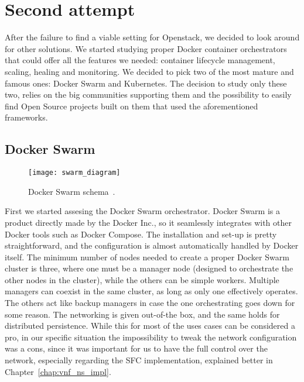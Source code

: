 \section{Second attempt}

After the failure to find a viable setting for Openstack, we decided to look
around for other solutions. We started studying proper Docker container
orchestrators that could offer all the features we needed: container lifecycle
management, scaling, healing and monitoring. We decided to pick two of the most
mature and famous ones: Docker Swarm and Kubernetes. The decision to study only
these two, relies on the big communities supporting them and the possibility to
easily find Open Source projects built on them that used the aforementioned
frameworks.

\subsection{Docker Swarm}

\begin{figure}[t]
  \centering
  \texttt{[image: swarm\_diagram]}
  \caption[Docker Swarm schema]{Docker Swarm schema~\cite{dockerSwarmWiki}.}
  \label{chap:archimpl:sec:secondattempt:img:dockerswarm}
\end{figure}

First we started assesing the Docker Swarm orchestrator. Docker Swarm is a
product directly made by the Docker Inc., so it seamlessly integrates with other
Docker tools such as Docker Compose. The installation and set-up is pretty
straightforward, and the configuration is almost automatically handled by Docker
itself. The minimum number of nodes needed to create a proper Docker Swarm
cluster is three, where one must be a manager node (designed to orchestrate the
other nodes in the cluster), while the others can be simple workers. Multiple
managers can coexist in the same cluster, as long as only one effectively
operates. The others act like backup managers in case the one orchestrating goes
down for some reason. The networking is given out-of-the box, and the same holds
for distributed persistence. While this for most of the uses cases can be
considered a pro, in our specific situation the impossibility to tweak the
network configuration was a cons, since it was important for us to have the full
control over the network, especially regarding the SFC implementation, explained
better in Chapter~\ref{chap:vnf_ns_impl}.

